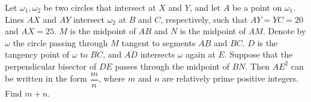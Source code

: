 Let $\omega_1,\omega_2$ be two circles that intersect at $X$ and $Y$, and let $A$ be a point on $\omega_1$. Lines $AX$ and $AY$ intersect $\omega_2$ at $B$ and $C$, respectively, such that $AY=YC=20$ and $AX=25$. $M$ is the midpoint of $AB$ and $N$ is the midpoint of $AM$. Denote by $\omega$ the circle passing through $M$ tangent to segments $AB$ and $BC$. $D$ is the tangency point of $\omega$ to $\overline{BC}$, and $\overline{AD}$ intersects $\omega$ again at $E$. Suppose that the perpendicular bisector of $DE$ passes through the midpoint of $BN$. Then $AE^2$ can be written in the form $\dfrac{m}{n}$, where $m$ and $n$ are relatively prime positive integers. Find $m+n$.
